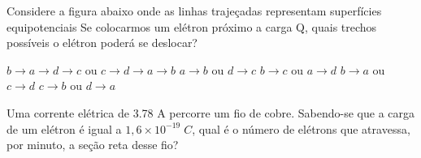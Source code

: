 \documentclass[12pt, addpoints]{exam}
\begin{document}
        \begin{questions}
\begin{multicols*}{2}
\question Considere a figura abaixo onde as linhas trajeçadas representam superfícies equipotenciais Se colocarmos um elétron próximo a carga Q, quais trechos possíveis o elétron poderá se deslocar?
        
        \begin{center}
            \begin{minipage}[c]{0.5\linewidth}
            \end{minipage}
        \end{center}
        
        

\begin{choices}
\choice $b\rightarrow a\rightarrow d\rightarrow c$ ou $c\rightarrow d\rightarrow a\rightarrow b$ 
\choice $a\rightarrow b$ ou $d\rightarrow c$ 
\choice $b\rightarrow c$ ou $a\rightarrow d$ 
\choice $b\rightarrow a$ ou $c\rightarrow d$ 
\choice $c\rightarrow b$ ou $d\rightarrow a$ 
\end{choices}
\question Uma corrente elétrica de    3.78 A percorre um ﬁo de cobre. Sabendo-se que a carga de um elétron é igual a $1,6\times 10^{-19}\;C$, qual é o número de elétrons que atravessa, por minuto, a seção reta desse ﬁo?


\end{multicols*}
\end{questions}
\end{document}

